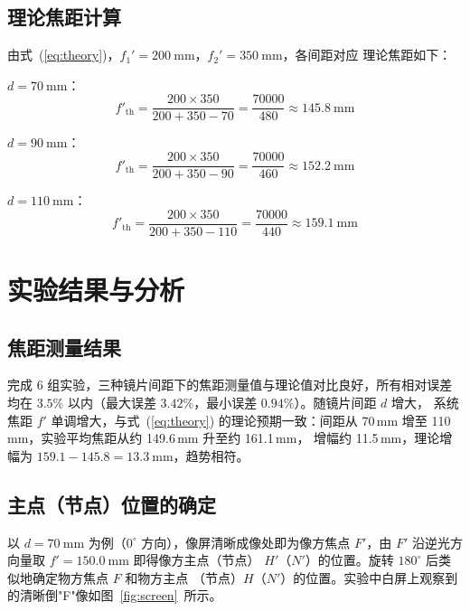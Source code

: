\documentclass[12pt, a4paper]{article}
\begin{document}
\subsection{理论焦距计算}

由式~(\ref{eq:theory})，$f_1' = 200\ \mathrm{mm}$，$f_2' = 350\ \mathrm{mm}$，各间距对应
理论焦距如下：

$d = 70\ \mathrm{mm}$：
\begin{equation}
  f'_{\mathrm{th}} = \frac{200 \times 350}{200 + 350 - 70}
                   = \frac{70000}{480} \approx 145.8\ \mathrm{mm}
\end{equation}

$d = 90\ \mathrm{mm}$：
\begin{equation}
  f'_{\mathrm{th}} = \frac{200 \times 350}{200 + 350 - 90}
                   = \frac{70000}{460} \approx 152.2\ \mathrm{mm}
\end{equation}

$d = 110\ \mathrm{mm}$：
\begin{equation}
  f'_{\mathrm{th}} = \frac{200 \times 350}{200 + 350 - 110}
                   = \frac{70000}{440} \approx 159.1\ \mathrm{mm}
\end{equation}

\section{实验结果与分析}

\subsection{焦距测量结果}

完成 6 组实验，三种镜片间距下的焦距测量值与理论值对比良好，所有相对误差均在
$3.5\%$ 以内（最大误差 $3.42\%$，最小误差 $0.94\%$）。随镜片间距 $d$ 增大，
系统焦距 $f'$ 单调增大，与式~(\ref{eq:theory}) 的理论预期一致：间距从
70\,mm 增至 110\,mm，实验平均焦距从约 149.6\,mm 升至约 161.1\,mm，
增幅约 11.5\,mm，理论增幅为 $159.1-145.8=13.3\ \mathrm{mm}$，趋势相符。

\subsection{主点（节点）位置的确定}

以 $d = 70\ \mathrm{mm}$ 为例（$0^\circ$ 方向），像屏清晰成像处即为像方焦点
$F'$，由 $F'$ 沿逆光方向量取 $f' = 150.0\ \mathrm{mm}$ 即得像方主点（节点）
$H'$（$N'$）的位置。旋转 $180^\circ$ 后类似地确定物方焦点 $F$ 和物方主点
（节点）$H$（$N'$）的位置。实验中白屏上观察到的清晰倒"F"像如图~\ref{fig:screen}~所示。
\end{document}
